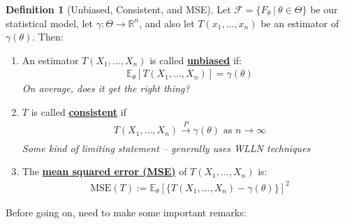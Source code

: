 \documentclass[11pt]{scrartcl}
\newcommand{\R}[0]{\mathbb{R}}
\theoremstyle{definition}
\newtheorem{definition}{Definition}
\theoremstyle{remark}
\newcommand{\dfn}[1]{\textbf{\underline{#1}}}
\newcommand{\dist}[0]{\mathcal{F}}
\newcommand{\stat}[0]{T(X_1, ..., X_n )}
\newcommand{\EXth}[1]{\mathbb{E}_\theta \left[ #1 \right]}
\begin{document}
\begin{definition}[Unbiased, Consistent, and MSE] Let $\dist = \{ F_\theta\ |\ \theta \in \Theta \}$ be our statistical model, let $\gamma: \Theta \rightarrow \R^n$, and also let $T(x_1, ..., x_n)$ be an estimator of $\gamma (\theta)$. Then: 
\begin{enumerate}[noitemsep]
	\item An estimator $T(X_1, ..., X_n)$ is called \dfn{unbiased} if: 
	\begin{align}
		\EXth{\stat} = \gamma(\theta)
	\end{align}
	\emph{On average, does it get the right thing?} 
	\item $T$ is called \dfn{consistent} if 
	\begin{align}
		\stat \xrightarrow[]{P} \gamma(\theta) \text{ as } n \rightarrow \infty 
	\end{align}
	\emph{Some kind of limiting statement -- generally uses WLLN techniques} 
	\item The \dfn{mean squared error (MSE)} of $\stat$ is: 
	\begin{align}
		\text{MSE}(T):= \EXth{\{ \stat - \gamma(\theta) \}}^2
	\end{align}
\end{enumerate}
\end{definition}
Before going on, need to make some important remarks: 
\end{document}
